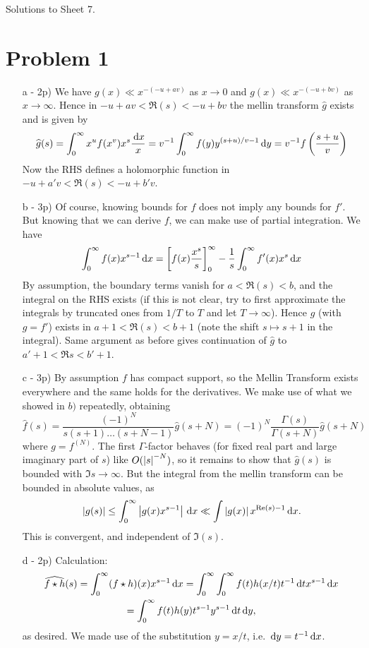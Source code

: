 \documentclass[a4paper,11pt]{article}
\author{Max von Consbruch}
\begin{document}
\begin{center}
    \huge{Solutions to Sheet 7.}
\end{center}

\section*{Problem 1}
\begin{enumerate}
\item[a - 2p)] We have $g(x) \ll x^{-(-u+av)}$ as $x \to 0$ and 
        $g(x) \ll x^{-(-u+bv)}$ as $x \to \infty$. Hence in $-u+av < 
        \Re(s)< -u+bv$ the mellin transform $\hat g$ exists and is given by
    \[
        \widehat g (s) = \int_0^\infty x^uf(x^v)x^s \frac{\mathrm{\,d} x}x 
        = v^{-1} \int_0^\infty f(y)y^{(s+u)/v-1} \mathrm{\,d} y = v^{-1} f\left(
            \frac{s+u}v \right)
    \]
    Now the RHS defines a holomorphic function in $-u+a'v < \Re(s) < 
    -u + b'v$. 
\item[b - 3p)]Of course, knowing bounds for $f$ does not imply any bounds for 
    $f'$. But knowing that we can derive $f$, we can make use of partial
    integration. We have
    \[
        \int_0^\infty f(x) x^{s-1} \mathrm{\,d} x = \left[f(x)
        \frac{x^s}s\right]_0^\infty - \frac 1s \int_0^\infty f'(x)x^s \mathrm{\,d} x
    \]
    By assumption, the boundary terms vanish for $a < \Re (s) < b$, and
    the integral on the RHS exists (if this is not clear, try to first 
    approximate the integrals by truncated ones from $1/T$ to $T$ and let 
    $T \to \infty$). Hence  $\hat{g}$ (with $g=f'$) exists in $a+1 < \Re(s) <
    b+1$
    (note the shift $s \mapsto s+1$ in the integral). Same argument as
    before gives continuation of $\hat g$ to $a'+1 < \Re s < b'+1$. 
\item[c - 3p)] By assumption $f$ has compact support, so the Mellin Transform
    exists everywhere and the same holds for the derivatives. We make use
    of what we showed in $b)$ repeatedly, obtaining
    \[
        \hat f(s) = \frac{(-1)^N}{s(s+1)\dots(s+N-1)} \hat g(s+N)
        = (-1)^N \frac{\Gamma(s)}{\Gamma(s+N)} \hat g(s+N)
    \]
    where $g= f^{(N)}$. The first $\Gamma$-factor behaves (for 
    fixed real part and large imaginary part of $s$) like $O(\left\lvert s \right\rvert^{-N})$, 
    so it remains to show that $\hat g(s)$ is bounded with $\Im s \to \infty$. But the integral
    from the mellin transform can be bounded in absolute values, as
    \[
        \left\lvert g(s) \right\rvert \leq \int_0^\infty \left\lvert g(x) x^{s-1} \right\rvert \mathrm{\,d} x
        \ll \int \left\lvert g(x) \right\rvert x^{\operatorname{Re}(s)-1} \mathrm{\,d} x.
    \]
    This is convergent, and independent of $\Im(s)$. 
\item [d - 2p)] Calculation: 
    \begin{multline*}
        \widehat{f \star h}(s) = \int_0^\infty (f \star h)(x) x^{s-1} \mathrm{\,d} x
        = \int_0^\infty \int_0^\infty f(t) h(x/t) t^{-1} \mathrm{\,d} t x^{s-1} \mathrm{\,d} x
        \\ = \int_0^\infty f(t) h(y) t^{s-1}y^{s-1} \mathrm{\,d} t \mathrm{\,d} y,
    \end{multline*}
    as desired. We made use of the substitution $y = x/t$, i.e. $\mathrm{\,d} y = 
    t^{-1} \mathrm{\,d} x$. 
\end{enumerate}
\end{document}
